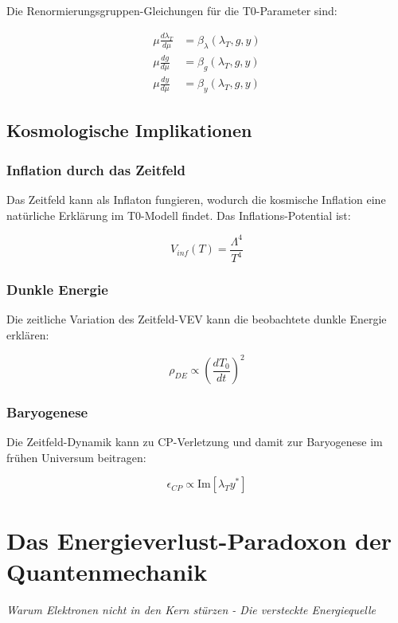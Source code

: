 \documentclass[12pt,a4paper]{report}
\begin{document}
Die Renormierungsgruppen-Gleichungen für die T0-Parameter sind:

\begin{align}
	\mu \frac{d\lambda_T}{d\mu} &= \beta_\lambda(\lambda_T, g, y) \\
	\mu \frac{dg}{d\mu} &= \beta_g(\lambda_T, g, y) \\
	\mu \frac{dy}{d\mu} &= \beta_y(\lambda_T, g, y)
\end{align}

\section{Kosmologische Implikationen}

\subsection{Inflation durch das Zeitfeld}

Das Zeitfeld kann als Inflaton fungieren, wodurch die kosmische Inflation eine natürliche Erklärung im T0-Modell findet. Das Inflations-Potential ist:

\begin{equation}
	V_{inf}(T) = \frac{\Lambda^4}{T^4}
\end{equation}

\subsection{Dunkle Energie}

Die zeitliche Variation des Zeitfeld-VEV kann die beobachtete dunkle Energie erklären:

\begin{equation}
	\rho_{DE} \propto \left(\frac{dT_0}{dt}\right)^2
\end{equation}

\subsection{Baryogenese}

Die Zeitfeld-Dynamik kann zu CP-Verletzung und damit zur Baryogenese im frühen Universum beitragen:

\begin{equation}
	\epsilon_{CP} \propto \text{Im}[\lambda_T y^*]
\end{equation}

% 
	\chapter{Das Energieverlust-Paradoxon der Quantenmechanik}
\textit{Warum Elektronen nicht in den Kern stürzen - Die versteckte Energiequelle}
\end{document}
